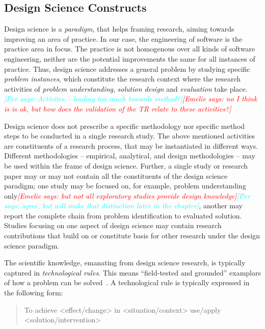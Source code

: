 \documentclass[graybox]{svmult}
\newcommand{\emelie}[1]{\textcolor{red}{{\it [Emelie says: #1]}}}
\newcommand{\per}[1]{\textcolor{cyan}{{\it [Per says: #1]}}}
\newcommand{\emelie}[1]{}
\newcommand{\per}[1]{}
\begin{document}
\subsection{Design Science Constructs}

Design science is a \emph{paradigm}, that helps framing research, aiming towards improving an area of practice. In our case, the engineering of software is the practice area in focus. The practice is not homogenous over all kinds of software engineering, neither are the potential improvements the same for all instances of practice. Thus, design science addresses a general problem by studying  specific \emph{problem instances}, which constitute the research context where the research activities of \emph{problem understanding}, \emph{solution design} and \emph{evaluation} take place. \per{Activites -- leading too much towards method?}\emelie{no I think is is ok, but how does the validation of the TR relate to these activities?}

Design science does not prescribe a specific methodology nor specific method steps to be conducted in a single research study. The above mentioned activities are constituents of  a research process, that may be instantiated in different ways. Different methodologies -- empirical, analytical, and  design methodologies -- may be used within the frame of design science. Further, a single study or research paper may or may not contain all the constituents of the design science paradigm; one study may be focused on, for example,  problem understanding only\emelie{but not all exploratory studies provide design knowledge}\per{agree, but will make that distinction later in the chapter}, another may report the complete chain from problem identification to evaluated solution. Studies focusing on one aspect of design science may contain research contributions that build on or constitute basis for other research under the design science paradigm.

The scientific knowledge, emanating from design science research, is typically captured in \emph{technological rules}. This means ``field-tested and grounded'' examplars of how a problem can be solved~\cite{van_aken_management_2004}. A technological rule is typically expressed in the following form: 

\begin{quote}{To achieve <effect/change> in <situation/context> use/apply <solution/intervention>}\end{quote}
\end{document}

